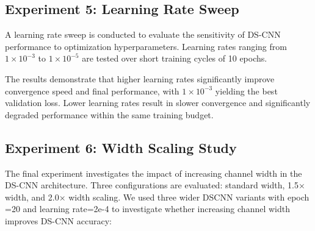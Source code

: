 \documentclass[conference]{IEEEtran}
\begin{document}
\subsection{\textbf{Experiment 5: Learning Rate Sweep}}

A learning rate sweep is conducted to evaluate the sensitivity of DS-CNN performance to optimization hyperparameters. Learning rates ranging from \(1 \times 10^{-3}\) to \(1 \times 10^{-5}\) are tested over short training cycles of 10 epochs.

\begin{table}[htbp]
\centering
\caption{Learning Rate Sweep Results}
\label{tab:lr_sweep}
\renewcommand{\arraystretch}{1.2}

\end{table}

The results demonstrate that higher learning rates significantly improve convergence speed and final performance, with \(1 \times 10^{-3}\) yielding the best validation loss. Lower learning rates result in slower convergence and significantly degraded performance within the same training budget.


\subsection{\textbf{Experiment 6: Width Scaling Study}}

The final experiment investigates the impact of increasing channel width in the DS-CNN architecture. Three configurations are evaluated: standard width, 1.5× width, and 2.0× width scaling.
We used three wider DSCNN variants with epoch =20 and learning rate=2e-4 to investigate whether increasing channel width improves DS-CNN accuracy:
\end{document}
